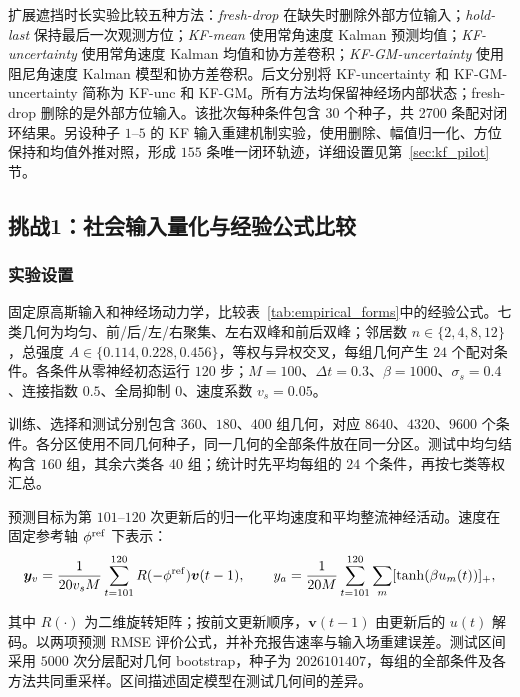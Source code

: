 \documentclass[UTF8,fontset=windows,11pt]{ctexart}
\begin{document}
扩展遮挡时长实验比较五种方法：\textit{fresh-drop} 在缺失时删除外部方位输入；\textit{hold-last} 保持最后一次观测方位；\textit{KF-mean} 使用常角速度 Kalman 预测均值；\textit{KF-uncertainty} 使用常角速度 Kalman 均值和协方差卷积；\textit{KF-GM-uncertainty} 使用阻尼角速度 Kalman 模型和协方差卷积。后文分别将 KF-uncertainty 和 KF-GM-uncertainty 简称为 KF-unc 和 KF-GM。所有方法均保留神经场内部状态；fresh-drop 删除的是外部方位输入。该批次每种条件包含 30 个种子，共 2700 条配对闭环结果。另设种子 $1$--$5$ 的 KF 输入重建机制实验，使用删除、幅值归一化、方位保持和均值外推对照，形成 $155$ 条唯一闭环轨迹，详细设置见第~\ref{sec:kf_pilot} 节。


\subsection{挑战1：社会输入量化与经验公式比较}
\label{sec:challenge1_results}
\subsubsection{实验设置}
固定原高斯输入和神经场动力学，比较表~\ref{tab:empirical_forms}中的经验公式。七类几何为均匀、前/后/左/右聚集、左右双峰和前后双峰；邻居数 $n\in\{2,4,8,12\}$，总强度 $A\in\{0.114,0.228,0.456\}$，等权与异权交叉，每组几何产生 $24$ 个配对条件。各条件从零神经初态运行 $120$ 步；$M=100$、$\Delta t=0.3$、$\beta=1000$、$\sigma_s=0.4$、连接指数 $0.5$、全局抑制 $0$、速度系数 $v_s=0.05$。

训练、选择和测试分别包含 $360$、$180$、$400$ 组几何，对应 $8640$、$4320$、$9600$ 个条件。各分区使用不同几何种子，同一几何的全部条件放在同一分区。测试中均匀结构含 $160$ 组，其余六类各 $40$ 组；统计时先平均每组的 $24$ 个条件，再按七类等权汇总。

\begin{samepage}
预测目标为第 $101$--$120$ 次更新后的归一化平均速度和平均整流神经活动。速度在固定参考轴 $\phi^{\rm ref}$ 下表示：
\begin{equation}
 \boldsymbol y_v=\frac1{20v_sM}\sum_{t=101}^{120}R(-\phi^{\rm ref})\boldsymbol v(t-1),\qquad
 y_a=\frac1{20M}\sum_{t=101}^{120}\sum_m[\tanh(\beta u_m(t))]_+,
\end{equation}
\end{samepage}
其中 $R(\cdot)$ 为二维旋转矩阵；按前文更新顺序，$\boldsymbol v(t-1)$ 由更新后的 $u(t)$ 解码。以两项预测 RMSE 评价公式，并补充报告速率与输入场重建误差。测试区间采用 $5000$ 次分层配对几何 bootstrap，种子为 $2026101407$，每组的全部条件及各方法共同重采样。区间描述固定模型在测试几何间的差异。
\end{document}
